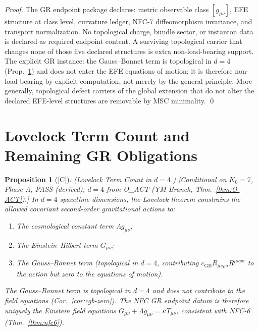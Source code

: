 \documentclass[12pt,oneside]{amsbook}
\theoremstyle{plain}
\newtheorem{proposition}[theorem]{Proposition}
\theoremstyle{definition}
\theoremstyle{remark}
\newcommand{\status}[1]{\textup{[#1]}}
\begin{document}
\begin{proof}
The GR endpoint package declares: metric observable class
$[g_{\mu\nu}]$, EFE structure at class level, curvature ledger,
NFC-7 diffeomorphism invariance, and transport normalization.
No topological charge, bundle sector, or instanton data is declared
as required endpoint content.
A surviving topological carrier that changes none of those five
declared structures is extra non-load-bearing support.
The explicit GR instance: the Gauss--Bonnet term is topological in
$d=4$ (Prop.~\ref{prop:gr-lovelock}) and does not enter the EFE
equations of motion; it is therefore non-load-bearing by explicit
computation, not merely by the general principle.
More generally, topological defect carriers of the global extension
that do not alter the declared EFE-level structures are removable
by MSC minimality.
\qed
\end{proof}



\section{Lovelock Term Count and Remaining GR Obligations}
\label{sec:gr-lovelock}

\begin{proposition}[\status{C}]\label{prop:gr-lovelock}
\textup{(Lovelock Term Count in $d=4$.)}
\textup{[Conditional on $K_0=7$, Phase-A, PASS (derived), $d=4$
from O\_ACT (YM Branch, Thm.~\ref{thm:O-ACT}).]}
In $d=4$ spacetime dimensions, the Lovelock theorem constrains
the allowed covariant second-order gravitational actions to:
\begin{enumerate}[label=\textup{(\arabic*)}]
 \item The cosmological constant term $\Lambda g_{\mu\nu}$;
 \item The Einstein--Hilbert term $G_{\mu\nu}$;
 \item The Gauss--Bonnet term (topological in $d=4$,
 contributing $c_{\mathrm{GB}} R_{\mu\nu\rho\sigma}
 R^{\mu\nu\rho\sigma}$ to the action but zero to the
 equations of motion).
\end{enumerate}
The Gauss--Bonnet term is topological in $d=4$ and does not
contribute to the field equations (Cor.~\ref{cor:cgb-zero}).
The NFC GR endpoint datum is therefore uniquely the Einstein
field equations $G_{\mu\nu} + \Lambda g_{\mu\nu} = \kappa T_{\mu\nu}$,
consistent with NFC-6 (Thm.~\ref{thm:nfc6}).
\end{proposition}
\end{document}
